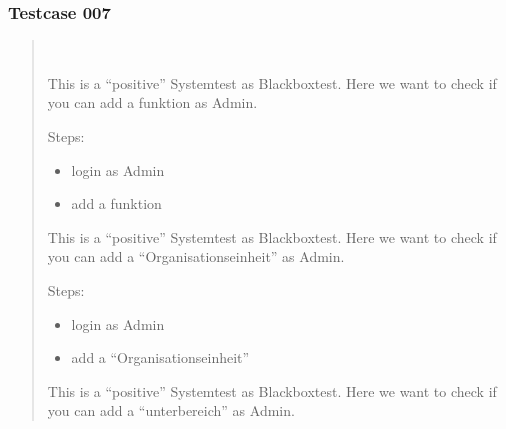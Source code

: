 \documentclass[letterpaper,10pt,english]{sphinxmanual}
\begin{document}
\subsubsection{Testcase 007}
\label{\detokenize{masterCodeDoc:testcase-007}}\begin{quote}


\begin{fulllineitems}
~

\begin{fulllineitems}
This is a “positive” Systemtest as Blackboxtest.
Here we want to check if you can add a funktion as Admin.

Steps:
\begin{itemize}
\item {} 
login as Admin

\item {} 
add a funktion

\end{itemize}

\end{fulllineitems}



\begin{fulllineitems}
This is a “positive” Systemtest as Blackboxtest.
Here we want to check if you can add a “Organisationseinheit” as Admin.

Steps:
\begin{itemize}
\item {} 
login as Admin

\item {} 
add a “Organisationseinheit”

\end{itemize}

\end{fulllineitems}



\begin{fulllineitems}
This is a “positive” Systemtest as Blackboxtest.
Here we want to check if you can add a “unterbereich” as Admin.


\end{fulllineitems}
\end{fulllineitems}
\end{quote}
\end{document}
